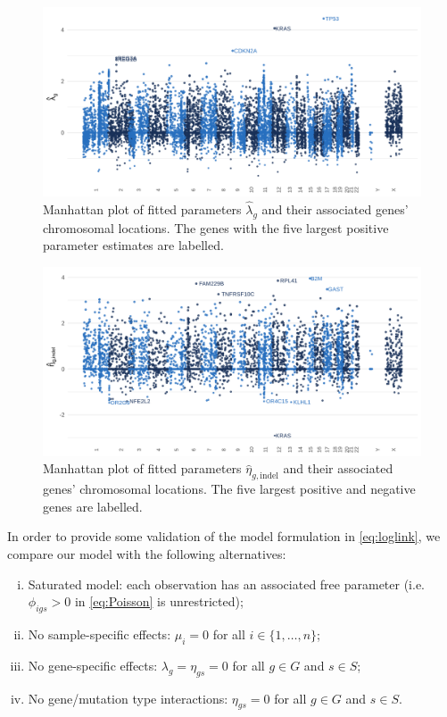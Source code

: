 \documentclass[12pt]{article}
\begin{document}
\begin{figure}[htbp]
\centering
\includegraphics[width=6in]{figures/fig4.png}
\vspace*{0mm}
\caption{Manhattan plot of fitted parameters $\hat{\lambda}_g$ and their associated genes' chromosomal locations. The genes with the five largest positive parameter estimates are labelled. \label{fig:manhat_plot}}
\end{figure}

\begin{figure}[htbp]
\centering
\includegraphics[width=6in]{figures/fig5.png}
\caption{Manhattan plot of fitted parameters $\hat{\eta}_{g,\text{indel}}$ and their associated genes' chromosomal locations. The five largest positive and negative genes are labelled.  \label{fig:manhat_plot_indel}}
\end{figure}
In order to provide some validation of the model formulation in \eqref{eq:loglink}, we compare our model with the following alternatives: 
\begin{enumerate}[(i)]
\item Saturated model: each observation has an associated free parameter (i.e. $\phi_{igs} > 0$ in \eqref{eq:Poisson} is unrestricted);
\item No sample-specific effects:  $\mu_i = 0$ for all $i \in \{1,\ldots, n\}$;
\item No gene-specific effects: $\lambda_g = \eta_{gs} = 0$ for all $g \in G$ and $s\in S$; 
\item No gene/mutation type interactions: $\eta_{gs} =0$ for all $g \in G$ and $s\in S$.
\end{enumerate}
\end{document}
